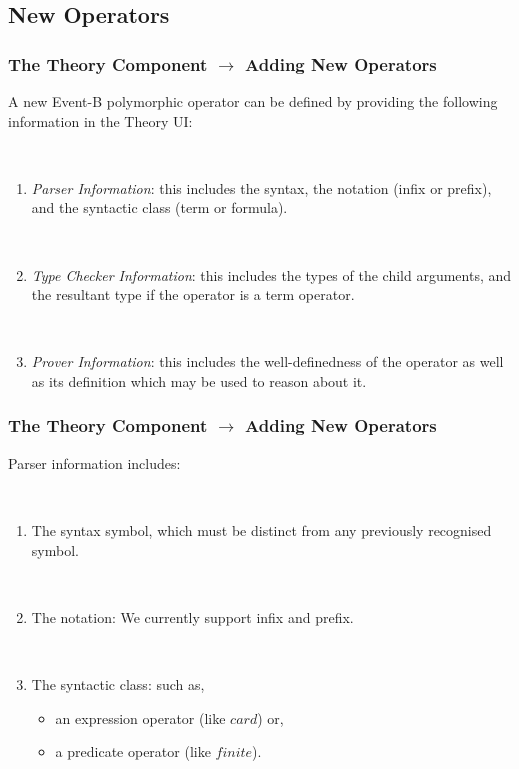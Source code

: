 \documentclass{beamer}
\begin{document}
\subsection{New Operators}
	\begin{frame}
		\frametitle{The Theory Component $\rightarrow$ Adding New Operators}
		A new Event-B polymorphic operator can be defined by providing the following information in the Theory UI:

~

		\begin{enumerate}
			\item \textit{Parser Information}: this includes the syntax, the notation (infix or prefix), and the syntactic class (term or formula).

~

			\item \textit{Type Checker Information}: this includes the types of the child arguments, and the resultant type if the operator is a term operator.

~
			\item \textit{Prover Information}: this includes the well-definedness of the operator as well as its definition which may be used to reason about it.
		\end{enumerate}
	\end{frame}
	\begin{frame}
		\frametitle{The Theory Component $\rightarrow$ Adding New Operators}
		Parser information includes:

~

		\begin{enumerate}
			\item The syntax symbol, which must be distinct from any previously recognised symbol.

~
			\item The notation: We currently support infix and prefix.

~
			\item The syntactic class: such as,
				\begin{itemize}
					\item an expression operator (like $card$) or,
					\item a predicate operator (like $finite$).
				\end{itemize}
		\end{enumerate}
	\end{frame}
\end{document}
